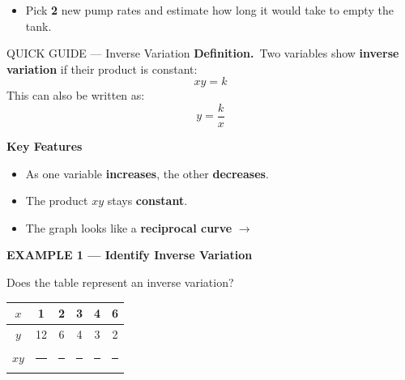 \documentclass[11pt]{article}
\newcommand{\examplehead}[1]{%
  \vspace{0.5em}%
  \noindent\textbf{\large #1}%
  \vspace{0.3em}%
}
\begin{document}
\begin{itemize}[leftmargin=*]
  \item Pick \textbf{2} new pump rates and estimate how long it would take to empty the tank.
\end{itemize}
\vspace{0.8in}

\begin{quickbox}{QUICK GUIDE --- Inverse Variation}
\textbf{Definition.}\ Two variables show \textbf{inverse variation} if their product is constant:
\[
  xy = k
\]
This can also be written as:
\[
  y = \frac{k}{x}
\]

\textbf{Key Features}
\begin{itemize}[leftmargin=*,itemsep=2pt]
  \item As one variable \textbf{increases}, the other \textbf{decreases}.
  \item The product $xy$ stays \textbf{constant}.
  \item The graph looks like a \textbf{reciprocal curve} $\rightarrow$
\end{itemize}

\begin{center}
\end{center}
\end{quickbox}

\examplehead{\colorbox{highlightyellow}{EXAMPLE 1 --- Identify Inverse Variation}}

Does the table represent an inverse variation?

\begin{center}
\renewcommand{\arraystretch}{1.4}
\begin{tabular}{|c|c|c|c|c|c|}
  \hline
  $x$  & 1  & 2 & 3 & 4 & 6 \\ \hline
  $y$  & 12 & 6 & 4 & 3 & 2 \\ \hline
  $xy$ & \rule{0.5in}{0.4pt} & \rule{0.5in}{0.4pt} & \rule{0.5in}{0.4pt} & \rule{0.5in}{0.4pt} & \rule{0.5in}{0.4pt} \\ \hline
\end{tabular}
\end{center}
\end{document}
